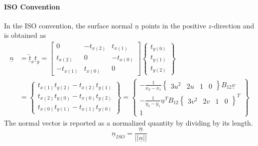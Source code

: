 \documentclass[
10pt, %
a4paper, %
oneside, %
headinclude,footinclude, %
BCOR5mm, %
]{scrartcl}
\begin{document}
\paragraph{ISO Convention}
In the ISO convention, the surface normal $\underline{n}$ points in the positive $z$-direction and is obtained as
\begin{equation}
  \begin{split}
  \underline{n} &= \underline{\tilde{t}}_x \underline{t}_y = \begin{bmatrix}
    0        & -t_{x(2)} & t_{x(1)}\\
    t_{x(2)} & 0         & -t_{x(0)}\\
    -t_{x(1)} & t_{x(0)} & 0
 \end{bmatrix}
 \begin{Bmatrix} t_{y(0)} \\ t_{y(1)} \\ t_{y(2)}  \end{Bmatrix}\\
  &= \begin{Bmatrix}
  t_{x(1)}t_{y(2)} - t_{x(2)} t_{y(1)} \\
  t_{x(2)}t_{y(0)} - t_{x(0)} t_{y(2)} \\
  t_{x(0)}t_{y(1)} - t_{x(1)} t_{y(0)}
  \end{Bmatrix} =
  \begin{Bmatrix}
     - \frac{1}{x_2 - x_1} \begin{Bmatrix}3u^2 & 2u & 1 & 0\end{Bmatrix}  B_{12} \underline{v} \\
     - \frac{1}{y_2 - y_1} \underline{u}^T B_{12} \begin{Bmatrix} 3v^2 & 2v & 1 & 0 \end{Bmatrix} ^T \\
    1
  \end{Bmatrix}
\end{split}
\end{equation}
The normal vector is reported as a normalized quantity by dividing by its length.
\begin{equation}
  \underline{n}_{ISO} = \frac{\underline{n}}{\lvert \lvert{\underline{n}}\rvert \rvert}
\end{equation}
\end{document}
